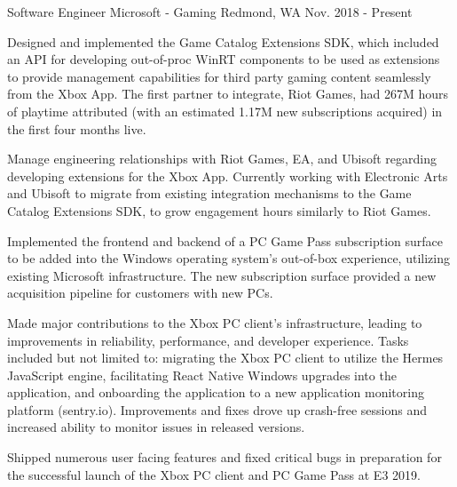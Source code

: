 
\begin{cventries}

  \cventry
    {Software Engineer} %
    {Microsoft - Gaming} %
    {Redmond, WA} %
    {Nov. 2018 - Present} %
    {
      \begin{cvitems} %
        \item{Designed and implemented the Game Catalog Extensions SDK, which included an API for developing out-of-proc WinRT components to be used as extensions to provide management capabilities for third party gaming content seamlessly from the Xbox App. The first partner to integrate, Riot Games, had 267M hours of playtime attributed (with an estimated 1.17M new subscriptions acquired) in the first four months live.} 
        \item{Manage engineering relationships with Riot Games, EA, and Ubisoft regarding developing extensions for the Xbox App. Currently working with Electronic Arts and Ubisoft to migrate from existing integration mechanisms to the Game Catalog Extensions SDK, to grow engagement hours similarly to Riot Games. } 
        \item{Implemented the frontend and backend of a PC Game Pass subscription surface to be added into the Windows operating system's out-of-box experience, utilizing existing Microsoft infrastructure. The new subscription surface provided a new acquisition pipeline for customers with new PCs.} 
        \item{Made major contributions to the Xbox PC client's infrastructure, leading to improvements in reliability, performance, and developer experience. Tasks included but not limited to: migrating the Xbox PC client to utilize the Hermes JavaScript engine, facilitating React Native Windows upgrades into the application, and onboarding the application to a new application monitoring platform (sentry.io). Improvements and fixes drove up crash-free sessions and increased ability to monitor issues in released versions.}
	      \item{Shipped numerous user facing features and fixed critical bugs in preparation for the successful launch of the Xbox PC client and PC Game Pass at E3 2019.}	
      \end{cvitems}
    }


\end{cventries}
